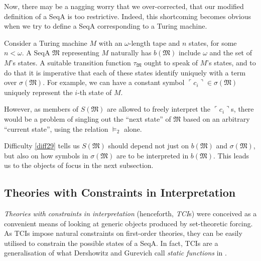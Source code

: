 \documentclass[12pt]{article}
\numberwithin{equation}{section}
\begin{document}
Now, there may be a nagging worry that we over-corrected, that our modified definition of a SeqA is too restrictive. Indeed, this shortcoming becomes obvious when we try to define a SeqA corresponding to a Turing machine.

\begin{diff}\label{diff29}
Consider a Turing machine $M$ with an $\omega$-length tape and $n$ states, for some $n < \omega$. A SeqA $\mathfrak{M}$ representing $M$ naturally has $b(\mathfrak{M})$ include $\omega$ and the set of $M$'s states. A suitable transition function $\tau_{\mathfrak{M}}$ ought to speak of $M$'s states, and to do that it is imperative that each of these states identify uniquely with a term over $\sigma(\mathfrak{M})$. For example, we can have a constant symbol $\ulcorner c_i \urcorner \in \sigma(\mathfrak{M})$ uniquely represent the $i$-th state of $M$. 

However, as members of $S(\mathfrak{M})$ are allowed to freely interpret the $\ulcorner c_i \urcorner$s, there would be a problem of singling out the ``next state'' of $\mathfrak{M}$ based on an arbitrary ``current state'', using the relation $\models_2$ alone.
\end{diff}

Difficulty \ref{diff29} tells us $S(\mathfrak{M})$ should depend not just on $b(\mathfrak{M})$ and $\sigma(\mathfrak{M})$, but also on how symbols in $\sigma(\mathfrak{M})$ are to be interpreted in $b(\mathfrak{M})$. This leads us to the objects of focus in the next subsection.

\subsection{Theories with Constraints in Interpretation}\label{ssect23}

\emph{Theories with constraints in interpretation} (henceforth, \emph{TCI}s) were conceived as a convenient means of looking at generic objects produced by set-theoretic forcing. As TCIs impose natural constraints on first-order theories, they can be easily utilised to constrain the possible states of a SeqA. In fact, TCIs are a generalisation of what Dershowitz and Gurevich call \textit{static functions} in \cite{dershowitz}.
\end{document}

